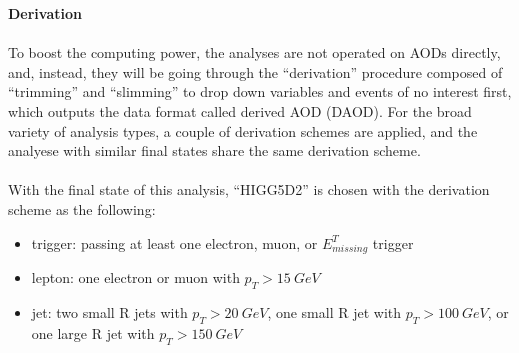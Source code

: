 \noindent
{\bf Derivation}
\\
\\To boost the computing power, the analyses are not operated on AODs directly, and, instead, they will be going through the ``derivation'' procedure composed of ``trimming'' and ``slimming'' to drop down variables and events of no interest first, which outputs the data format called derived AOD (DAOD). For the broad variety of analysis types, a couple of derivation schemes are applied, and the analyese with similar final states share the same derivation scheme. 
\\
\\With the final state of this analysis, ``HIGG5D2'' is chosen with the derivation scheme as the following:
\begin{itemize}
  \item trigger: passing at least one electron, muon, or $E^{T}_{missing}$ trigger
  \item lepton: one electron or muon with $p_{T}>15~GeV$ 
  \item jet: two small R jets with $p_{T}>20~GeV$, one  small R jet with $p_{T}>100~GeV$, or one large R jet with $p_{T}>150~GeV$
\end{itemize}
